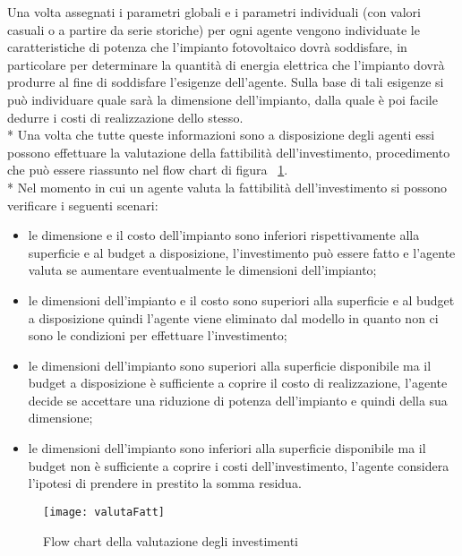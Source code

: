 \documentclass[12pt,a4paper,openright,twoside]{report}
\begin{document}
Una volta assegnati i parametri globali e i parametri individuali (con valori casuali o a partire da serie storiche) per ogni agente vengono individuate le caratteristiche di potenza che l'impianto fotovoltaico dovrà soddisfare, in particolare per determinare la quantità di energia elettrica che l'impianto dovrà produrre al fine di soddisfare l'esigenze dell'agente. Sulla base di tali esigenze si può individuare quale sarà la dimensione dell'impianto, dalla quale è poi facile dedurre i costi di realizzazione dello stesso.\\*
Una volta che tutte queste informazioni sono a disposizione degli agenti essi possono effettuare la valutazione della fattibilità dell'investimento, procedimento che può essere riassunto nel flow chart  di figura ~\ref{flowChartValFatt}.
\\*
Nel  momento in cui un agente valuta la fattibilità dell'investimento si possono verificare i seguenti scenari:
\begin{itemize}
\item le dimensione e il costo dell'impianto sono inferiori rispettivamente  alla superficie e al budget a disposizione, l'investimento può essere fatto e l'agente valuta se aumentare eventualmente le dimensioni dell'impianto;
\item le dimensioni dell'impianto e il costo sono superiori alla superficie e al budget a disposizione quindi l'agente viene eliminato dal modello in quanto non ci sono le condizioni per effettuare l'investimento;
\item le dimensioni dell'impianto sono superiori alla superficie disponibile ma il budget a disposizione è sufficiente a coprire il costo di realizzazione, l'agente decide se accettare una riduzione di potenza dell'impianto e quindi della sua dimensione;
\item le dimensioni dell'impianto sono inferiori alla superficie disponibile ma il budget non è sufficiente a coprire i costi dell'investimento, l'agente considera l'ipotesi di prendere in prestito la somma residua.
\end{itemize}

\begin{figure}[hbt]
	\centering
	\texttt{[image: valutaFatt]}
	\caption{Flow chart della valutazione degli investimenti}
	\label{flowChartValFatt}
\end{figure}
\end{document}

